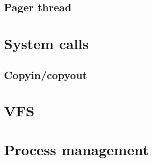 \documentclass[12pt,english]{article}
\begin{document}
\subsection{Pager thread}

\section{System calls}

\subsection{Copyin/copyout}

\section{VFS}

\section{Process management}
\end{document}

